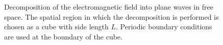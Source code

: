 \begin{figure}
\centering

\caption{Decomposition of the electromagnetic field into plane waves in free space. The spatial region in which the decomposition is performed is chosen as a cube with side length $L$. Periodic boundary conditions are used at the boundary of the cube.}
\label{figCh1_Vfree}
\end{figure}